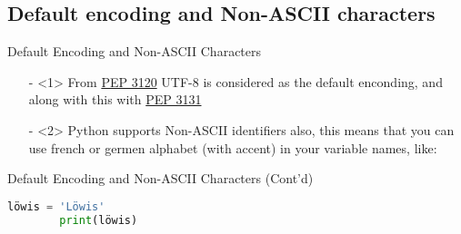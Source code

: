 \subsection{Default encoding and Non-ASCII characters}
\begin{frame}{Default Encoding and Non-ASCII Characters}
    \begin{itemize}
        \item[-]<1>
        From \href{https://peps.python.org/pep-3120/}{PEP 3120} UTF-8 is considered as the default enconding, and along with this with \href{https://peps.python.org/pep-3131/}{PEP 3131}
        
        \item[-]<2>
        Python supports Non-ASCII identifiers also, this means that you can use french or germen alphabet
        (with accent) in your variable names, like:
    \end{itemize}
\end{frame}

\begin{frame}[fragile]{Default Encoding and Non-ASCII Characters (Cont'd)}
    \begin{lstlisting}[language=python, keywordstyle=\color{Mulberry}\textbf]
        löwis = 'Löwis'
        print(löwis)
    \end{lstlisting}
\end{frame}
